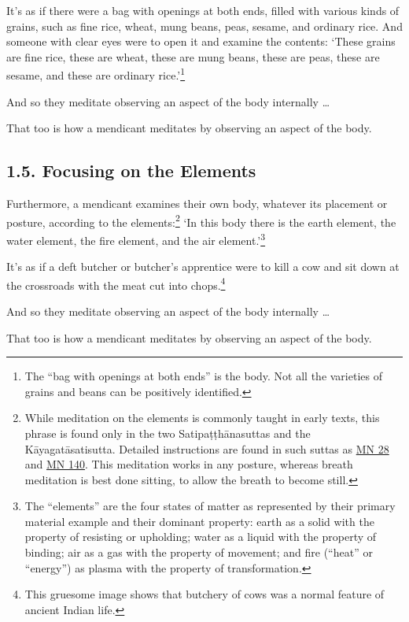 \documentclass[12pt,openany]{book}%
\begin{document}
It’s as if there were a bag with openings at both ends, filled with various kinds of grains, such as fine rice, wheat, mung beans, peas, sesame, and ordinary rice. And someone with clear eyes were to open it and examine the contents: ‘These grains are fine rice, these are wheat, these are mung beans, these are peas, these are sesame, and these are ordinary rice.’\footnote{The “bag with openings at both ends” is the body. Not all the varieties of grains and beans can be positively identified. } 

And so they meditate observing an aspect of the body internally … 

That too is how a mendicant meditates by observing an aspect of the body. 

\subsection*{1.5. Focusing on the Elements }

Furthermore, a mendicant examines their own body, whatever its placement or posture, according to the elements:\footnote{While meditation on the elements is commonly taught in early texts, this phrase is found only in the two \textsanskrit{Satipaṭṭhānasuttas} and the \textsanskrit{Kāyagatāsatisutta}. Detailed instructions are found in such suttas as \href{https://suttacentral.net/mn28/en/sujato}{MN 28} and \href{https://suttacentral.net/mn140/en/sujato}{MN 140}. This meditation works in any posture, whereas breath meditation is best done sitting, to allow the breath to become still. } ‘In this body there is the earth element, the water element, the fire element, and the air element.’\footnote{The “elements” are the four states of matter as represented by their primary material example and their dominant property: earth as a solid with the property of resisting or upholding; water as a liquid with the property of binding; air as a gas with the property of movement; and fire (“heat” or “energy”) as plasma with the property of transformation. } 

It’s as if a deft butcher or butcher’s apprentice were to kill a cow and sit down at the crossroads with the meat cut into chops.\footnote{This gruesome image shows that butchery of cows was a normal feature of ancient Indian life. } 

And so they meditate observing an aspect of the body internally … 

That too is how a mendicant meditates by observing an aspect of the body. 
\end{document}
